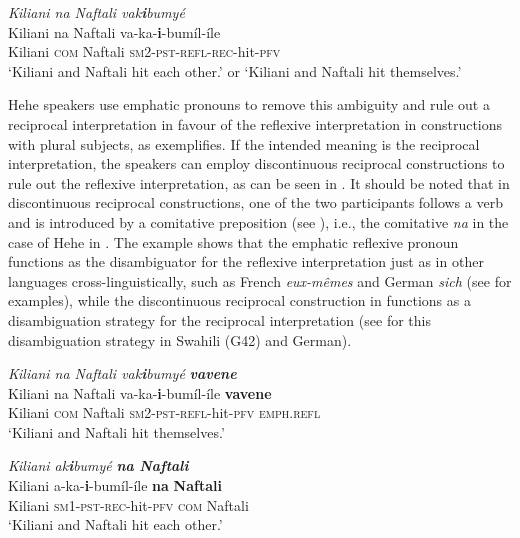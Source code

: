 \documentclass[output=paper,
            colorlinks, citecolor=brown
            ,draftmode
		  ]{langscibook}
\begin{document}
\ea\label{ex:ngwasi:12}
\textit{Kiliani na Naftali vak}\textbf{\textit{i}}\textit{bumyé}\\
\gll Kiliani   na   Naftali   va-ka-\textbf{i}{}-bumíl-íle\\
Kiliani   \textsc{com}   Naftali   \textsc{sm2-pst-refl-rec}-hit-\textsc{pfv}\\
\glt ‘Kiliani and Naftali hit each other.’ or ‘Kiliani and Naftali hit themselves.’
\z



Hehe speakers use emphatic pronouns to remove this ambiguity and rule out a reciprocal interpretation in favour of the reflexive interpretation in constructions with plural subjects, as  exemplifies. If the intended meaning is the reciprocal interpretation, the speakers can employ discontinuous reciprocal constructions to rule out the reflexive interpretation, as can be seen in . It should be noted that in discontinuous reciprocal constructions, one of the two participants follows a verb and is introduced by a comitative preposition (see \citealt{Dimitriadis2004,Dimitriadis2008, Haspelmath2007}), i.e., the comitative \textit{na} in the case of Hehe in . The example  shows that the emphatic reflexive pronoun functions as the disambiguator for the reflexive interpretation just as in other languages cross-linguistically, such as French \textit{eux\nobreakdash-mêmes} and German \textit{sich} (see \citet{Cable2014} for examples), while the discontinuous reciprocal construction in  functions as a disambiguation strategy for the reciprocal interpretation (see \citealt{Dimitriadis2004, SeidlDimitriadis2003} for this disambiguation strategy in Swahili (G42) and German).


\ea\label{ex:ngwasi:13}
\textit{Kiliani na Naftali vak}\textbf{\textit{i}}\textit{bumyé} \textbf{\textit{vavene}}\\
\gll Kiliani na Naftali   va-ka-\textbf{i}{}-bumíl-íle     \textbf{vavene}\\
Kiliani \textsc{com} Naftali \textsc{sm2-pst-refl}-hit-\textsc{pfv}  \textsc{emph.refl}\\
\glt ‘Kiliani and Naftali hit themselves.’


\ex\label{ex:ngwasi:14}
\textit{Kiliani ak}\textbf{\textit{i}}\textit{bumyé} \textbf{\textit{na} \textbf{\textit{Naftali}}}\\
\gll Kiliani a-ka-\textbf{i}{}-bumíl-íle     \textbf{na}   \textbf{Naftali}\\
Kiliani \textsc{sm1-pst-rec}-hit-\textsc{pfv}  \textsc{com}  {Naftali}\\
\glt ‘Kiliani and Naftali hit each other.’
\z
\end{document}
